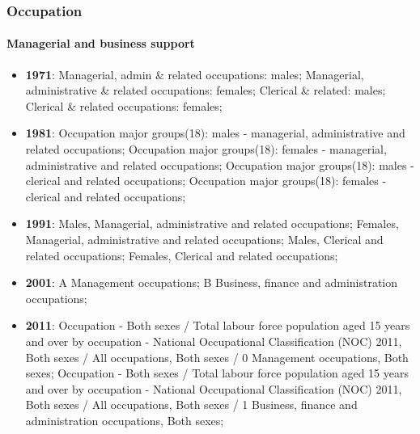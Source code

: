 \documentclass[a4paper]{article}
\begin{document}
\subsubsection{Occupation}
\paragraph{Managerial and business support}
\begin{itemize}
   \item{\textbf{1971}:  Managerial, admin \& related occupations: males; Managerial, administrative \& related occupations: females; Clerical \& related: males; Clerical \& related occupations: females;}
   \item{\textbf{1981}:  Occupation major groups(18): males - managerial, administrative and related occupations; Occupation major groups(18): females - managerial, administrative and related occupations; Occupation major groups(18): males - clerical and related occupations; Occupation major groups(18): females - clerical and related occupations;}
   \item{\textbf{1991}:  Males, Managerial, administrative and related occupations; Females, Managerial, administrative and related occupations; Males, Clerical and related occupations; Females, Clerical and related occupations;}
   \item{\textbf{2001}:  A Management occupations; B Business, finance and administration occupations;}
   \item{\textbf{2011}:  Occupation - Both sexes / Total labour force population aged 15 years and over by occupation - National Occupational Classification (NOC) 2011, Both sexes / All occupations, Both sexes / 0 Management occupations, Both sexes; Occupation - Both sexes / Total labour force population aged 15 years and over by occupation - National Occupational Classification (NOC) 2011, Both sexes / All occupations, Both sexes / 1 Business, finance and administration occupations, Both sexes;}
\end{itemize}
\end{document}
